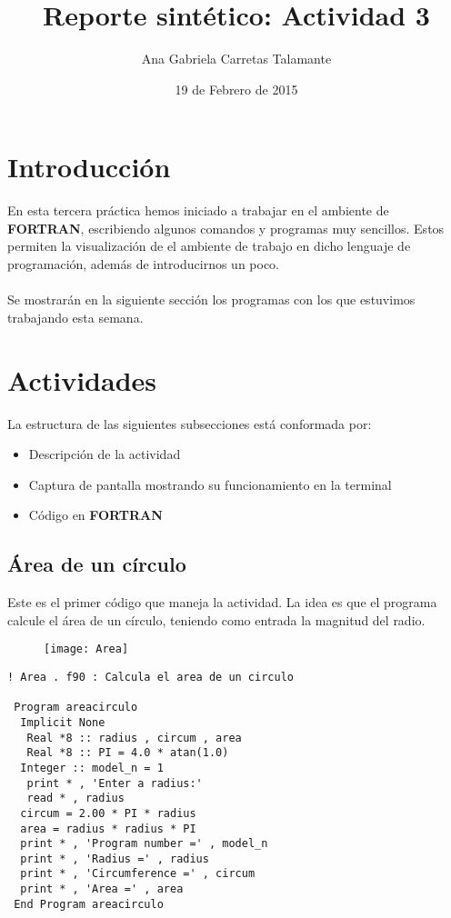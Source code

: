 \documentclass[12pt]{article}
\title{Reporte sintético: Actividad 3}
\author{Ana Gabriela Carretas Talamante}
\date{19 de Febrero de 2015}
\begin{document}
\maketitle

\section{Introducción}

En esta tercera práctica hemos iniciado a trabajar en el ambiente de \textbf{FORTRAN}, escribiendo algunos comandos y programas muy sencillos. Estos permiten la visualización de el ambiente de trabajo en dicho lenguaje de programación, además de introducirnos un poco.
\\
\\
Se mostrarán en la siguiente sección los programas con los que estuvimos trabajando esta semana.

\section{Actividades}
La estructura de las siguientes subsecciones está conformada por:
\begin{itemize}
\item Descripción de la actividad
\item Captura de pantalla mostrando su funcionamiento en la terminal
\item Código en \textbf{FORTRAN}
\end{itemize}
\subsection{Área de un círculo}
Este es el primer código que maneja la actividad. La idea es que el programa calcule el área de un círculo, teniendo como entrada la magnitud del radio.

\begin{figure}[H]
	\centering
    \texttt{[image: Area]}
\end{figure}

\begin{verbatim}! Area . f90 : Calcula el area de un circulo

 Program areacirculo
  Implicit None 
   Real *8 :: radius , circum , area 
   Real *8 :: PI = 4.0 * atan(1.0)
  Integer :: model_n = 1 
   print * , 'Enter a radius:' 
   read * , radius 
  circum = 2.00 * PI * radius 
  area = radius * radius * PI 
  print * , 'Program number =' , model_n 
  print * , 'Radius =' , radius 
  print * , 'Circumference =' , circum 
  print * , 'Area =' , area 
 End Program areacirculo \end{verbatim}
\end{document}
